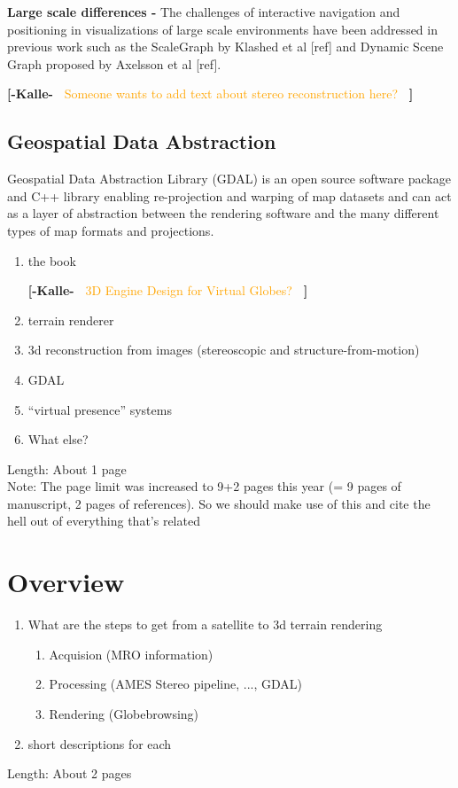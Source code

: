\documentclass[journal]{vgtc}                %
\newcommand{\kallecomment}[1]{\textbf{[-Kalle-~}
    \textcolor{orange}{#1}
    \textbf{~]}}
\begin{document}
\textbf{Large scale differences - } The challenges of interactive navigation and positioning in visualizations of large scale environments have been addressed in previous work such as the ScaleGraph by Klashed et al [ref] and Dynamic Scene Graph proposed by Axelsson et al [ref].

\kallecomment{Someone wants to add text about stereo reconstruction here?}

\subsection{Geospatial Data Abstraction}

Geospatial Data Abstraction Library (GDAL) is an open source software package and C++ library enabling re-projection and warping of map datasets and can act as a layer of abstraction between the rendering software and the many different types of map formats and projections.

\begin{enumerate}
\item the book

\kallecomment{3D Engine Design for Virtual Globes?}

\item terrain renderer
\item 3d reconstruction from images (stereoscopic and structure-from-motion)
\item GDAL
\item ``virtual presence'' systems
\item What else?
\end{enumerate}
Length: About 1 page\\
Note:  The page limit was increased to 9+2 pages this year (= 9 pages of manuscript, 2 pages of references). So we should make use of this and cite the hell out of everything that's related

\section{Overview} \label{sec:overview}



\begin{enumerate}
  \item What are the steps to get from a satellite to 3d terrain rendering
\begin{enumerate}
  \item Acquision (MRO information)
  \item Processing (AMES Stereo pipeline, ..., GDAL)
  \item Rendering (Globebrowsing)
\end{enumerate}
  \item short descriptions for each
\end{enumerate}
Length: About 2 pages
\end{document}

